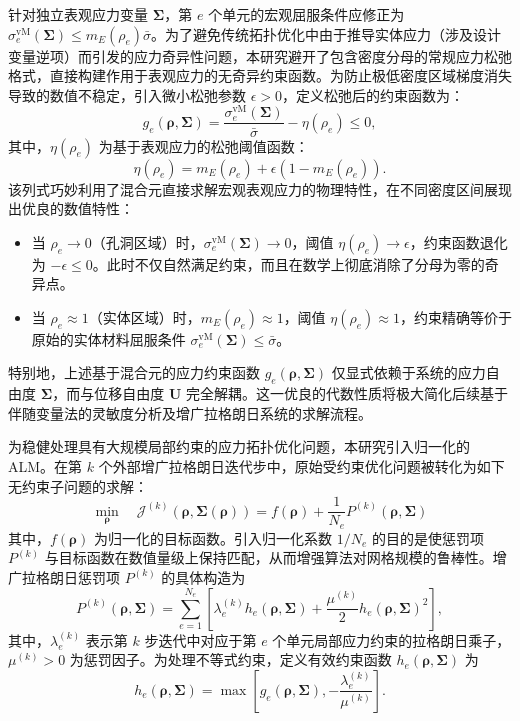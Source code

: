 针对独立表观应力变量 $\boldsymbol{\Sigma}$，第 $e$ 个单元的宏观屈服条件应修正为 $\sigma_e^{\text{vM}}(\boldsymbol{\Sigma}) \le m_E(\rho_e)\bar{\sigma}$。为了避免传统拓扑优化中由于推导实体应力（涉及设计变量逆项）而引发的应力奇异性问题，本研究避开了包含密度分母的常规应力松弛格式，直接构建作用于表观应力的无奇异约束函数。为防止极低密度区域梯度消失导致的数值不稳定，引入微小松弛参数 $\epsilon > 0$，定义松弛后的约束函数为：
\begin{equation}
	g_e(\boldsymbol{\rho}, \boldsymbol{\Sigma}) = \frac{\sigma_e^{\text{vM}}(\boldsymbol{\Sigma})}{\bar{\sigma}} - \eta(\rho_e) \le 0,
	\label{eq:ch5_apparent_stress_constraints}
\end{equation}
其中，$\eta(\rho_e)$ 为基于表观应力的松弛阈值函数：
\[
\eta(\rho_e) = m_E(\rho_e) + \epsilon(1 - m_E(\rho_e)).
\]
该列式巧妙利用了混合元直接求解宏观表观应力的物理特性，在不同密度区间展现出优良的数值特性：
\begin{itemize}
	\item 当 $\rho_e \to 0$（孔洞区域）时，$\sigma_e^{\text{vM}}(\boldsymbol{\Sigma}) \to 0$，阈值 $\eta(\rho_e) \to \epsilon$，约束函数退化为 $-\epsilon \le 0$。此时不仅自然满足约束，而且在数学上彻底消除了分母为零的奇异点。
	
	\item 当 $\rho_e \approx 1$（实体区域）时，$m_E(\rho_e) \approx 1$，阈值 $\eta(\rho_e) \approx 1$，约束精确等价于原始的实体材料屈服条件 $\sigma_e^{\text{vM}}(\boldsymbol{\Sigma}) \le \bar{\sigma}$。
\end{itemize}
特别地，上述基于混合元的应力约束函数 $g_e(\boldsymbol{\rho}, \boldsymbol{\Sigma})$ 仅显式依赖于系统的应力自由度 $\boldsymbol{\Sigma}$，而与位移自由度 $\boldsymbol{U}$ 完全解耦。这一优良的代数性质将极大简化后续基于伴随变量法的灵敏度分析及增广拉格朗日系统的求解流程。

为稳健处理具有大规模局部约束的应力拓扑优化问题，本研究引入归一化的 ALM。在第 $k$ 个外部增广拉格朗日迭代步中，原始受约束优化问题被转化为如下无约束子问题的求解：
\[
\min_{\boldsymbol{\rho}} \quad \mathcal{J}^{(k)}(\boldsymbol{\rho}, \boldsymbol{\Sigma}(\boldsymbol{\rho})) = f(\boldsymbol{\rho}) + \frac{1}{N_e} P^{(k)}(\boldsymbol{\rho}, \boldsymbol{\Sigma})
\]
其中，$f(\boldsymbol{\rho})$ 为归一化的目标函数。引入归一化系数 $1/N_e$ 的目的是使惩罚项 $P^{(k)}$ 与目标函数在数值量级上保持匹配，从而增强算法对网格规模的鲁棒性。增广拉格朗日惩罚项 $P^{(k)}$ 的具体构造为
\[
P^{(k)}(\boldsymbol{\rho}, \boldsymbol{\Sigma}) = \sum_{e=1}^{N_e} \left[ \lambda_e^{(k)} h_e(\boldsymbol{\rho}, \boldsymbol{\Sigma}) + \frac{\mu^{(k)}}{2} h_e(\boldsymbol{\rho}, \boldsymbol{\Sigma})^2 \right],
\]
其中，$\lambda_e^{(k)}$ 表示第 $k$ 步迭代中对应于第 $e$ 个单元局部应力约束的拉格朗日乘子，$\mu^{(k)} > 0$ 为惩罚因子。为处理不等式约束，定义有效约束函数 $h_e(\boldsymbol{\rho}, \boldsymbol{\Sigma})$ 为
\[
h_e(\boldsymbol{\rho}, \boldsymbol{\Sigma}) = \max \left[ g_e(\boldsymbol{\rho}, \boldsymbol{\Sigma}), -\frac{\lambda_e^{(k)}}{\mu^{(k)}} \right].
\]

